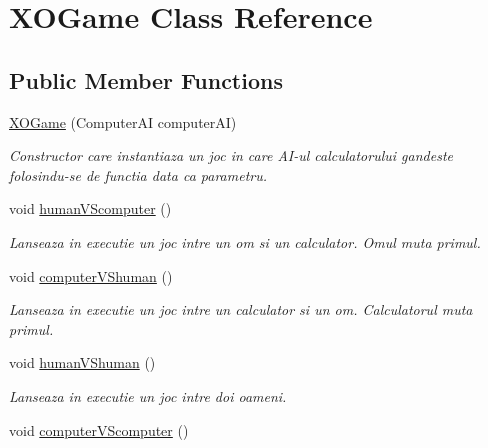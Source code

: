 \hypertarget{classXOGame}{
\section{XOGame Class Reference}
\label{classXOGame}
}
\subsection*{Public Member Functions}
\begin{DoxyCompactItemize}
\item 
\hyperlink{classXOGame_ae03433c323f4c08cfff2c9e8d26e7530}{XOGame} (ComputerAI computerAI)
\begin{DoxyCompactList}\small\item\em Constructor care instantiaza un joc in care AI-\/ul calculatorului gandeste folosindu-\/se de functia data ca parametru. \item\end{DoxyCompactList}\item 
\hypertarget{classXOGame_aacde44d6398b72595008996a7ac3d72d}{
void \hyperlink{classXOGame_aacde44d6398b72595008996a7ac3d72d}{humanVScomputer} ()}
\label{classXOGame_aacde44d6398b72595008996a7ac3d72d}

\begin{DoxyCompactList}\small\item\em Lanseaza in executie un joc intre un om si un calculator. Omul muta primul. \item\end{DoxyCompactList}\item 
\hypertarget{classXOGame_a322eaf2fceb6d4ff6f88102708b7d8ea}{
void \hyperlink{classXOGame_a322eaf2fceb6d4ff6f88102708b7d8ea}{computerVShuman} ()}
\label{classXOGame_a322eaf2fceb6d4ff6f88102708b7d8ea}

\begin{DoxyCompactList}\small\item\em Lanseaza in executie un joc intre un calculator si un om. Calculatorul muta primul. \item\end{DoxyCompactList}\item 
\hypertarget{classXOGame_aeb2ca697dff9b16d8abfc438e019c167}{
void \hyperlink{classXOGame_aeb2ca697dff9b16d8abfc438e019c167}{humanVShuman} ()}
\label{classXOGame_aeb2ca697dff9b16d8abfc438e019c167}

\begin{DoxyCompactList}\small\item\em Lanseaza in executie un joc intre doi oameni. \item\end{DoxyCompactList}\item 
\hypertarget{classXOGame_a2546fa6a5ee36ab0d380fe2b5ea5096f}{
void \hyperlink{classXOGame_a2546fa6a5ee36ab0d380fe2b5ea5096f}{computerVScomputer} ()}
\label{classXOGame_a2546fa6a5ee36ab0d380fe2b5ea5096f}


\end{DoxyCompactItemize}
